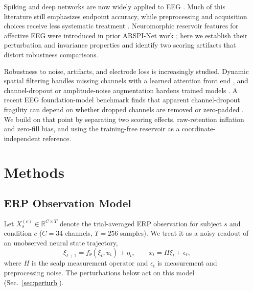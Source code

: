 \documentclass[conference]{IEEEtran}
\newcommand{\R}{\mathbb{R}}
\begin{document}
Spiking and deep networks are now widely applied to EEG \cite{gong2023sglnet,lawhern2018eegnet,craik2019deep}. Much of this literature still emphasizes endpoint accuracy, while preprocessing and acquisition choices receive less systematic treatment \cite{delpup2025preprocessing,kornblith2019similarity}. Neuromorphic reservoir features for affective EEG were introduced in prior ARSPI-Net work \cite{lane2023arspi,lane2024arspi}; here we establish their perturbation and invariance properties and identify two scoring artifacts that distort robustness comparisons.

Robustness to noise, artifacts, and electrode loss is increasingly studied. Dynamic spatial filtering handles missing channels with a learned attention front end \cite{banville2022dsf}, and channel-dropout or amplitude-noise augmentation hardens trained models \cite{rommel2022augment}. A recent EEG foundation-model benchmark finds that apparent channel-dropout fragility can depend on whether dropped channels are removed or zero-padded \cite{sirca2026beyond}. We build on that point by separating two scoring effects, raw-retention inflation and zero-fill bias, and using the training-free reservoir as a coordinate-independent reference.

\section{Methods}
\label{sec:methods}
\subsection{ERP Observation Model}
Let $X_s^{(c)}\in\R^{C\times T}$ denote the trial-averaged ERP observation for subject $s$ and condition $c$ ($C=34$ channels, $T=256$ samples). We treat it as a noisy readout of an unobserved neural state trajectory,
\begin{equation}\label{eq:obs}
    \xi_{t+1}=f_\theta(\xi_t,u_t)+\eta_t,\qquad
    x_t=H\xi_t+\epsilon_t,
\end{equation}
where $H$ is the scalp measurement operator and $\epsilon_t$ is measurement and preprocessing noise. The perturbations below act on this model (Sec.~\ref{sec:perturb}).
\end{document}
